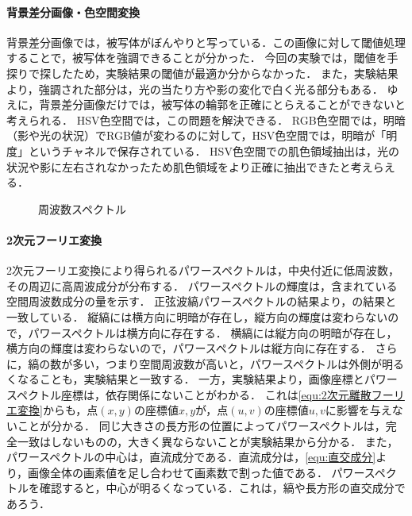 \paragraph{背景差分画像・色空間変換}
背景差分画像では，被写体がぼんやりと写っている．この画像に対して閾値処理することで，被写体を強調できることが分かった．
今回の実験では，閾値を手探りで探したため，実験結果の閾値が最適か分からなかった．
また，実験結果より，強調された部分は，光の当たり方や影の変化で白く光る部分もある．
ゆえに，背景差分画像だけでは，被写体の輪郭を正確にとらえることができないと考えられる．
HSV色空間では，この問題を解決できる．
RGB色空間では，明暗（影や光の状況）でRGB値が変わるのに対して，HSV色空間では，明暗が「明度」というチャネルで保存されている．
HSV色空間での肌色領域抽出は，光の状況や影に左右されなかったため肌色領域をより正確に抽出できたと考えらえる．
\begin{wrapfigure}{r}[0mm]{.3\textwidth}
    \centering
    \caption{周波数スペクトル}
    \label{fig:周波数スペクトル}
    \vspace{-.5cm}
\end{wrapfigure}
\paragraph{2次元フーリエ変換}
2次元フーリエ変換により得られるパワースペクトルは，中央付近に低周波数，その周辺に高周波成分が分布する．
パワースペクトルの輝度は，含まれている空間周波数成分の量を示す．
正弦波縞パワースペクトルの結果より，の結果と一致している．
縦縞には横方向に明暗が存在し，縦方向の輝度は変わらないので，パワースペクトルは横方向に存在する．
横縞には縦方向の明暗が存在し，横方向の輝度は変わらないので，パワースペクトルは縦方向に存在する．
さらに，縞の数が多い，つまり空間周波数が高いと，パワースペクトルは外側が明るくなることも，実験結果と一致する．
一方，実験結果より，画像座標とパワースペクトル座標は，依存関係にないことがわかる．
これは\eqref{equ:2次元離散フーリエ変換}からも，点\((x,y)\)の座標値\(x,y\)が，点\((u,v)\)の座標値\(u,v\)に影響を与えないことが分かる．
同じ大きさの長方形の位置によってパワースペクトルは，完全一致はしないものの，大きく異ならないことが実験結果から分かる．
また，パワースペクトルの中心は，直流成分である．直流成分は，\eqref{equ:直交成分}より，画像全体の画素値を足し合わせて画素数で割った値である．
パワースペクトルを確認すると，中心が明るくなっている．これは，縞や長方形の直交成分であろう．
